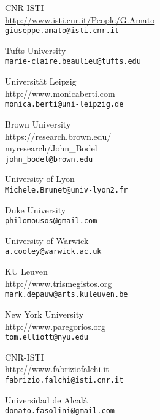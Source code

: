


\begin{contributors}


{ CNR-ISTI	  \\
{\url{http://www.isti.cnr.it/People/G.Amato} }\\
\texttt{giuseppe.amato@isti.cnr.it}
}

{   Tufts University	\\
\texttt{marie-claire.beaulieu@tufts.edu}
}
	

{ Universität Leipzig  \\
{http://www.monicaberti.com} \\
\texttt{monica.berti@uni-leipzig.de}
}

		
{ Brown University	  \\
{https://research.brown.edu/\\myresearch/John\_Bodel} \\
\texttt{john\_bodel@brown.edu}
}
			
			
{  University of Lyon \\
\texttt{Michele.Brunet@univ-lyon2.fr}
}
	
	
{  Duke University	 \\
\texttt{philomousos@gmail.com}
}
	
			
{ University of Warwick	  \\
\texttt{a.cooley@warwick.ac.uk}
}


{ KU Leuven	  \\
{http://www.trismegistos.org}	 \\
\texttt{mark.depauw@arts.kuleuven.be}
}
		

{ New York University  \\
{http://www.paregorios.org} \\
\texttt{tom.elliott@nyu.edu}
}
	
	
{  CNR-ISTI	 \\
{http://www.fabriziofalchi.it} \\
\texttt{fabrizio.falchi@isti.cnr.it}
}
	
{ Universidad de Alcalá	  \\
\texttt{donato.fasolini@gmail.com	}
}
	

\end{contributors}
